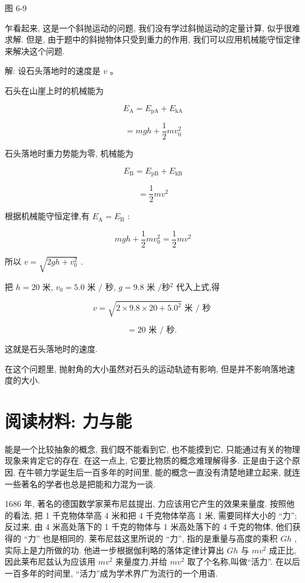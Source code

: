 \documentclass[10pt]{article}
\begin{document}
图 6-9

乍看起来, 这是一个斜抛运动的问题, 我们没有学过斜抛运动的定量计算, 似乎很难求解. 但是, 由于题中的斜抛物体只受到重力的作用, 我们可以应用机械能守恒定律来解决这个问题.

解: 设石头落地时的速度是 \(v\) 。

石头在山崖上时的机械能为

\[
{E}_{\mathrm{A}} = {E}_{\mathrm{{pA}}} + {E}_{\mathrm{{kA}}}
\]

\[
= {mgh} + \frac{1}{2}m{v}_{0}^{2}
\]

石头落地时重力势能为零, 机械能为

\[
{E}_{\mathrm{B}} = {E}_{\mathrm{{pB}}} + {E}_{\mathrm{{kB}}}
\]

\[
= \frac{1}{2}m{v}^{2}
\]

根据机械能守恒定律,有 \({E}_{\mathrm{A}} = {E}_{\mathrm{B}}\) :

\[
{mgh} + \frac{1}{2}m{v}_{0}^{2} = \frac{1}{2}m{v}^{2}
\]

所以 \(v = \sqrt{{2gh} + {v}_{0}^{2}}\) .

把 \(h = {20}\) 米, \({v}_{0} = {5.0}\) 米 \(/\) 秒, \(g = {9.8}\) 米 \(/秒{}^{2}\) 代入上式,得

\[
v = \sqrt{2 \times {9.8} \times {20} + {5.0}^{2}}\text{ 米 }/\text{ 秒 }
\]

\[
= {20}\text{ 米 }/\text{ 秒. }
\]

这就是石头落地时的速度.

在这个问题里, 抛射角的大小虽然对石头的运动轨迹有影响, 但是并不影响落地速度的大小.

\section*{阅读材料: 力与能}

能是一个比较抽象的概念, 我们既不能看到它, 也不能摸到它, 只能通过有关的物理现象来肯定它的存在. 在这一点上, 它要比物质的概念难理解得多. 正是由于这个原因, 在牛顿力学诞生后一百多年的时间里, 能的概念一直没有清楚地建立起来, 就连一些著名的学者也总是把能和力混为一谈.

1686 年, 著名的德国数学家莱布尼兹提出, 力应该用它产生的效果来量度. 按照他的看法, 把 1 千克物体举高 4 米和把 4 千克物体举高 1 米, 需要同样大小的 “力”; 反过来, 由 4 米高处落下的 1 千克的物体与 1 米高处落下的 4 千克的物体, 他们获得的 “力” 也是相同的. 莱布尼兹这里所说的 “力”, 指的是重量与高度的乘积 \({Gh}\) ,实际上是力所做的功. 他进一步根据伽利略的落体定律计算出 \({Gh}\) 与 \(m{v}^{2}\) 成正比,因此莱布尼兹认为应该用 \(m{v}^{2}\) 来量度力,并给 \(m{v}^{2}\) 取了个名称,叫做“活力”. 在以后一百多年的时间里, “活力”成为学术界广为流行的一个用语.
\end{document}
